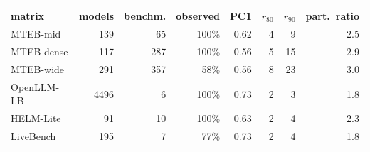\begin{tabular}{lrrrrrrr}\toprule
matrix & models & benchm. & observed & PC1 & $r_{80}$ & $r_{90}$ & part.\ ratio \\\midrule
MTEB-mid & 139 & 65 & 100\% & 0.62 & 4 & 9 & 2.5 \\
MTEB-dense & 117 & 287 & 100\% & 0.56 & 5 & 15 & 2.9 \\
MTEB-wide & 291 & 357 & 58\% & 0.56 & 8 & 23 & 3.0 \\
OpenLLM-LB & 4496 & 6 & 100\% & 0.73 & 2 & 3 & 1.8 \\
HELM-Lite & 91 & 10 & 100\% & 0.63 & 2 & 4 & 2.3 \\
LiveBench & 195 & 7 & 77\% & 0.73 & 2 & 4 & 1.8 \\
\bottomrule\end{tabular}
